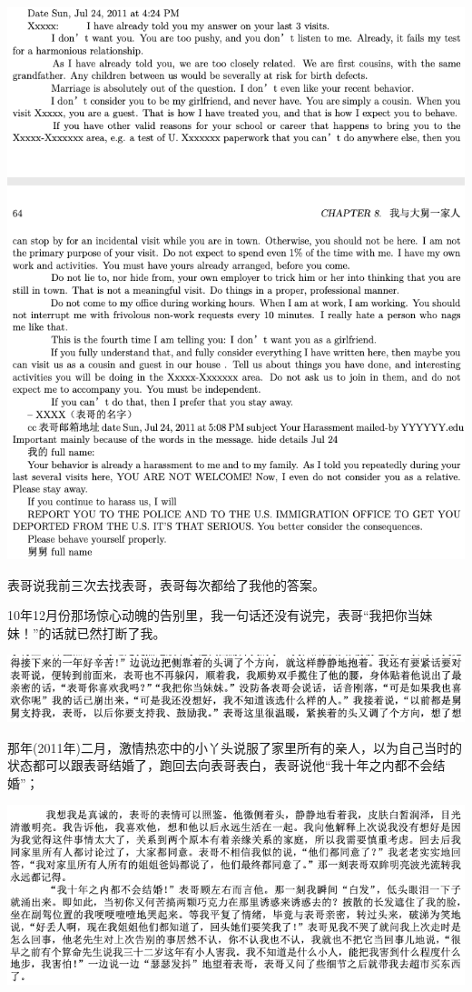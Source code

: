 \documentclass[9pt, b5paper]{article}
\begin{document}
\begin{center}
\includegraphics[width=.9\linewidth]{./pic/p1p64.png}
\end{center}

表哥说我前三次去找表哥，表哥每次都给了我他的答案。

10年12月份那场惊心动魄的告别里，我一句话还没有说完，表哥“我把你当妹妹！”的话就已然打断了我。

\begin{center}
\includegraphics[width=.9\linewidth]{./pic/p1p43.png}
\end{center}

那年(2011年)二月，激情热恋中的小丫头说服了家里所有的亲人，以为自己当时的状态都可以跟表哥结婚了，跑回去向表哥表白，表哥说他“我十年之内都不会结婚”；

\begin{center}
\includegraphics[width=.9\linewidth]{./pic/p1p50-3.png}
\end{center}
\end{document}
